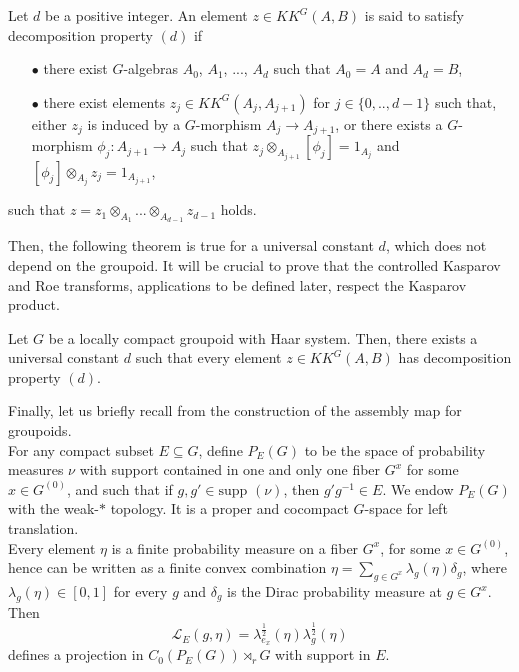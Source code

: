 \begin{definition}\label{DecompositionPropertyD}
Let $d$ be a positive integer. An element $z\in KK^G(A,B)$ is said to satisfy decomposition property $(d)$ if
\begin{itemize}
\item[$\bullet$] there exist $G$-algebras $A_0$, $A_1$, ..., $A_d$ such that $A_0=A$ and $A_d=B$, 
\item[$\bullet$] there exist elements $z_j \in KK^G(A_{j},A_{j+1})$ for $j\in\{0,..,d-1\}$ such that, either $z_j$ is induced by a $G$-morphism $A_j \rightarrow A_{j+1}$, or there exists a $G$-morphism $\phi_j : A_{j+1}\rightarrow A_j$ such that $z_j \otimes_{A_{j+1}} [\phi_j] = 1_{A_j}$ and $ [\phi_j] \otimes_{A_{j}} z_j  = 1_{A_{j+1}}$,
\end{itemize}
such that $z = z_1 \otimes_{A_1}  ... \otimes_{A_{d-1}} z_{d-1} $ holds.
\end{definition}

Then, the following theorem is true for a universal constant $d$, which does not depend on the groupoid. It will be crucial to prove that the controlled Kasparov and Roe transforms, applications to be defined later, respect the Kasparov product. 

\begin{thm}\label{propertyD}
Let $G$ be a locally compact groupoid with Haar system. Then, there exists a universal constant $d$ such that every element $z\in KK^G(A,B)$ has decomposition property $(d)$.
\end{thm}

Finally, let us briefly recall from \cite{TuBC} the construction of the assembly map for groupoids. \\

For any compact subset $E\subseteq G$, define $P_E(G)$ to be the space of probability measures $\nu $ with support contained in one and only one fiber $G^x$ for some $x\in G^{(0)}$, and such that if $g,g'\in \text{supp }(\nu)$, then $g'g^{-1}\in E$. We endow $P_E(G)$ with the weak-$*$ topology. It is a proper and cocompact $G$-space for left translation.\\

Every element $\eta$ is a finite probability measure on a fiber $G^x$, for some $x\in G^{(0)}$, hence can be written as a finite convex combination $\eta = \sum_{g\in G^{x}}\lambda_g(\eta)\delta_g$, where $\lambda_g(\eta)\in [0,1]$ for every $g$ and $\delta_g$ is the Dirac probability measure at $g\in G^x$. Then 
\[\mathcal L_E(g,\eta) = \lambda_{e_x}^{\frac{1}{2}}(\eta)\lambda_g^{\frac{1}{2}}(\eta)\]  
 defines a projection in $C_0(P_E(G))\rtimes_r G$ with support in $E$.

